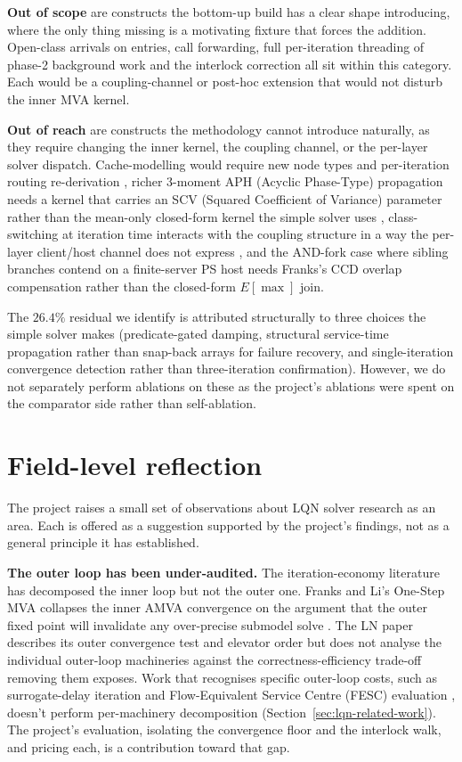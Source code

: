 \textbf{Out of scope} are constructs the bottom-up build has a clear shape introducing, where the only thing missing is a motivating fixture that forces the addition. Open-class arrivals on entries, call forwarding, full per-iteration threading of phase-2 background work and the interlock correction all sit within this category. Each would be a coupling-channel or post-hoc extension that would not disturb the inner MVA kernel.

\textbf{Out of reach} are constructs the methodology cannot introduce naturally, as they require changing the inner kernel, the coupling channel, or the per-layer solver dispatch. Cache-modelling would require new node types and per-iteration routing re-derivation \cite{gao2024}, richer 3-moment APH (Acyclic Phase-Type) propagation needs a kernel that carries an SCV (Squared Coefficient of Variance) parameter rather than the mean-only closed-form kernel the simple solver uses \cite{bobbio2005}, class-switching at iteration time interacts with the coupling structure in a way the per-layer client/host channel does not express \cite{baskett75}, and the AND-fork case where sibling branches contend on a finite-server PS host needs Franks's CCD overlap compensation \cite{franks99} rather than the closed-form $E[\max]$ join.

The $26.4\%$ residual we identify is attributed structurally to three choices the simple solver makes (predicate-gated damping, structural service-time propagation rather than snap-back arrays for failure recovery, and single-iteration convergence detection rather than three-iteration confirmation). However, we do not separately perform ablations on these as the project's ablations were spent on the comparator side rather than self-ablation.



\section{Field-level reflection}
\label{sec:concl-reflection}

The project raises a small set of observations about LQN solver research as an area. Each is offered as a suggestion supported by the project's findings, not as a general principle it has established.

\textbf{The outer loop has been under-audited.} The iteration-economy literature has decomposed the inner loop but not the outer one. Franks and Li's One-Step MVA \cite{franksli2012} collapses the inner AMVA convergence on the argument that the outer fixed point will invalidate any over-precise submodel solve \cite{franksli2012}. The LN paper \cite{casale2024} describes its outer convergence test and elevator order but does not analyse the individual outer-loop machineries against the correctness-efficiency trade-off removing them exposes. Work that recognises specific outer-loop costs, such as surrogate-delay iteration and Flow-Equivalent Service Centre (FESC) evaluation \cite{islam2022}, doesn't perform per-machinery decomposition (Section~\ref{sec:lqn-related-work}). The project's evaluation, isolating the convergence floor and the interlock walk, and pricing each, is a contribution toward that gap.


